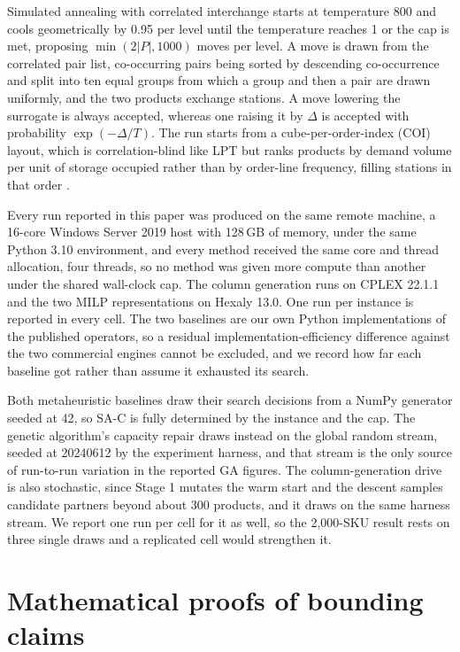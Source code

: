\documentclass[]{interact}
\begin{document}
Simulated annealing with correlated interchange starts at temperature 800 and cools geometrically by 0.95 per level until the temperature reaches 1 or the cap is met, proposing $\min(2|P|, 1000)$ moves per level. A move is drawn from the correlated pair list, co-occurring pairs being sorted by descending co-occurrence and split into ten equal groups from which a group and then a pair are drawn uniformly, and the two products exchange stations. A move lowering the surrogate is always accepted, whereas one raising it by $\Delta$ is accepted with probability $\exp(-\Delta/T)$. The run starts from a cube-per-order-index (COI) layout, which is correlation-blind like LPT but ranks products by demand volume per unit of storage occupied rather than by order-line frequency, filling stations in that order \citep{kim2012}.

Every run reported in this paper was produced on the same remote machine, a 16-core Windows Server 2019 host with 128\,GB of memory, under the same Python 3.10 environment, and every method received the same core and thread allocation, four threads, so no method was given more compute than another under the shared wall-clock cap. The column generation runs on CPLEX 22.1.1 and the two MILP representations on Hexaly 13.0. One run per instance is reported in every cell. The two baselines are our own Python implementations of the published operators, so a residual implementation-efficiency difference against the two commercial engines cannot be excluded, and we record how far each baseline got rather than assume it exhausted its search.

Both metaheuristic baselines draw their search decisions from a NumPy generator seeded at 42, so SA-C is fully determined by the instance and the cap. The genetic algorithm's capacity repair draws instead on the global random stream, seeded at 20240612 by the experiment harness, and that stream is the only source of run-to-run variation in the reported GA figures. The column-generation drive is also stochastic, since Stage 1 mutates the warm start and the descent samples candidate partners beyond about 300 products, and it draws on the same harness stream. We report one run per cell for it as well, so the 2,000-SKU result rests on three single draws and a replicated cell would strengthen it.

\section{Mathematical proofs of bounding claims}\label{app:bounds}
\end{document}
